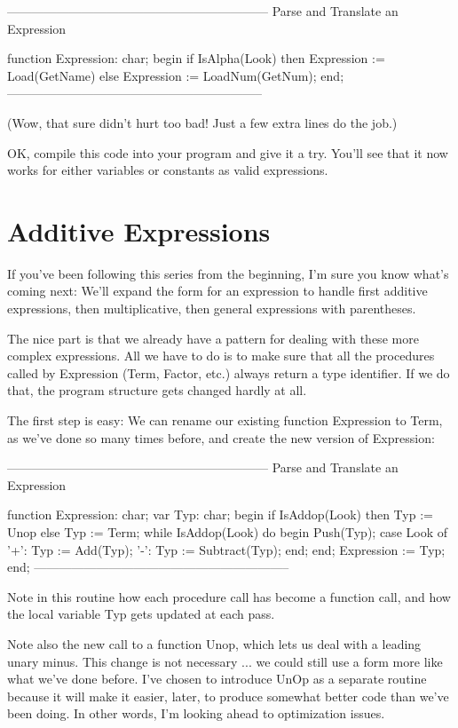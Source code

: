 \documentclass[float=false, crop=false]{standalone}
\begin{document}
{---------------------------------------------------------------}
{ Parse and Translate an Expression }

function Expression: char;
begin
   if IsAlpha(Look) then
      Expression := Load(GetName)
   else
      Expression := LoadNum(GetNum);
end;
{--------------------------------------------------------------}


(Wow, that sure didn't hurt too bad! Just a few extra lines do the job.)

OK, compile this code into your program and give it a try. You'll see that it
now works for either variables or constants as valid expressions.


\section{Additive Expressions}

If you've been following this series from the beginning, I'm sure you know
what's coming next: We'll expand the form for an expression to handle first
additive expressions, then multiplicative, then general expressions with
parentheses.

The nice part is that we already have a pattern for dealing with these more
complex expressions. All we have to do is to make sure that all the procedures
called by Expression (Term, Factor, etc.) always return a type identifier. If we
do that, the program structure gets changed hardly at all.

The first step is easy: We can rename our existing function Expression to Term,
as we've done so many times before, and create the new version of Expression:


{---------------------------------------------------------------}
{ Parse and Translate an Expression }

function Expression: char;
var Typ: char;
begin
   if IsAddop(Look) then
      Typ := Unop
   else
      Typ := Term;
   while IsAddop(Look) do begin
      Push(Typ);
      case Look of
       '+': Typ := Add(Typ);
       '-': Typ := Subtract(Typ);
      end;
   end;
   Expression := Typ;
end;
{--------------------------------------------------------------}


Note in this routine how each procedure call has become a function call, and how
the local variable Typ gets updated at each pass.

Note also the new call to a function Unop, which lets us deal with a leading
unary minus. This change is not necessary ... we could still use a form more
like what we've done before. I've chosen to introduce UnOp as a separate routine
because it will make it easier, later, to produce somewhat better code than
we've been doing. In other words, I'm looking ahead to optimization issues.
\end{document}
